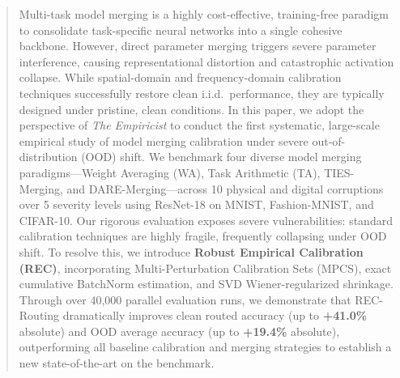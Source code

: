 \documentclass{article}
\theoremstyle{plain}
\theoremstyle{definition}
\theoremstyle{remark}
\begin{document}

\printAffiliationsAndNotice{}

\begin{abstract}
Multi-task model merging is a highly cost-effective, training-free paradigm to consolidate task-specific neural networks into a single cohesive backbone. However, direct parameter merging triggers severe parameter interference, causing representational distortion and catastrophic activation collapse. While spatial-domain and frequency-domain calibration techniques successfully restore clean i.i.d.\ performance, they are typically designed under pristine, clean conditions. In this paper, we adopt the perspective of \textit{The Empiricist} to conduct the first systematic, large-scale empirical study of model merging calibration under severe out-of-distribution (OOD) shift. We benchmark four diverse model merging paradigms---Weight Averaging (WA), Task Arithmetic (TA), TIES-Merging, and DARE-Merging---across 10 physical and digital corruptions over 5 severity levels using ResNet-18 on MNIST, Fashion-MNIST, and CIFAR-10. Our rigorous evaluation exposes severe vulnerabilities: standard calibration techniques are highly fragile, frequently collapsing under OOD shift. To resolve this, we introduce \textbf{Robust Empirical Calibration (REC)}, incorporating Multi-Perturbation Calibration Sets (MPCS), exact cumulative BatchNorm estimation, and SVD Wiener-regularized shrinkage. Through over 40,000 parallel evaluation runs, we demonstrate that REC-Routing dramatically improves clean routed accuracy (up to \textbf{+41.0\%} absolute) and OOD average accuracy (up to \textbf{+19.4\%} absolute), outperforming all baseline calibration and merging strategies to establish a new state-of-the-art on the benchmark.
\end{abstract}
\end{document}
